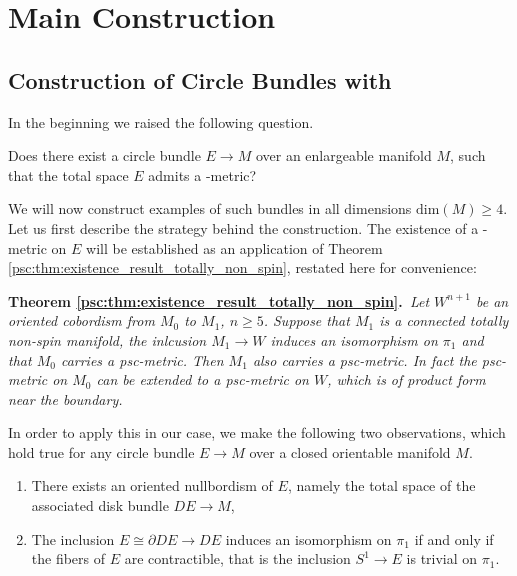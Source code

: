 \section{Main Construction}
\label{sec:constr}

\subsection{Construction of Circle Bundles with \psc}

In the beginning we raised the following question.

\begin{question}
	\label{constr:question_A}
	Does there exist a circle bundle $E \to M$ over an enlargeable manifold $M$, such that the total space $E$ admits a \psc-metric?
\end{question}

We will now construct examples of such bundles in all dimensions $\mathrm{dim}(M) \geq 4$. Let us first describe the strategy behind the construction. The existence of a \psc-metric on $E$ will be established as an application of Theorem \ref{psc:thm:existence_result_totally_non_spin}, restated here for convenience:

\vspace{\baselineskip}
\noindent\textbf{Theorem \ref{psc:thm:existence_result_totally_non_spin}.}\itshape\ 
Let $W^{n+1}$ be an oriented cobordism from $M_0$ to $M_1$, $n \geq 5$. Suppose that $M_1$ is a connected totally non-spin manifold, the inlcusion $M_1 \to W$ induces an isomorphism on $\pi_1$ and that $M_0$ carries a psc-metric. Then $M_1$ also carries a psc-metric. In fact the psc-metric on $M_0$ can be extended to a psc-metric on $W$, which is of product form near the boundary. 
\normalfont
\vspace{\baselineskip}

In order to apply this in our case, we make the following two observations, which hold true for any circle bundle $E \to M$ over a closed orientable manifold $M$. 

\begin{enumerate}[label=(\roman*)]
	\item There exists an oriented nullbordism of $E$, namely the total space of the associated disk bundle $DE \to M$,
	\item \label{constr:eq:circle_bundle_observation2} The inclusion $E \cong \partial DE \to DE$ induces an isomorphism on $\pi_1$ if and only if the fibers of $E$ are contractible, that is the inclusion $S^1 \to E$ is trivial on $\pi_1$.
\end{enumerate}

